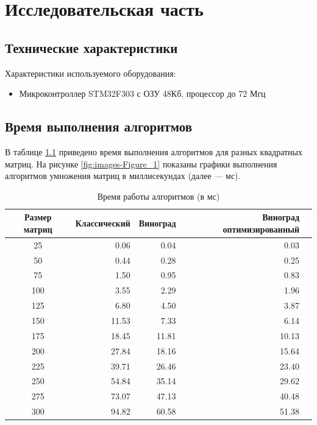 \chapter{Исследовательская часть}

\section{Технические характеристики}

Характеристики используемого оборудования:
\begin{itemize}
    \item Микроконтроллер STM32F303 с ОЗУ 48Кб, процессор  до 72 Мгц \cite{bib1}
\end{itemize}

\section{Время выполнения алгоритмов}

В таблице \ref{tbl:time_measurements} приведено время выполнения алгоритмов для разных
квадратных матриц. На рисунке \ref{fig:images-Figure_1} показаны графики
выполнения алгоритмов умножения матриц в миллисекундах (далее --- мс).

\begin{table}[h]
	\begin{center}
		\begin{threeparttable}
		\captionsetup{justification=raggedright,singlelinecheck=off}
		\caption{Время работы алгоритмов (в мс)}
		\label{tbl:time_measurements}
		\begin{tabular}{|c|r|r|r|r|}
			\hline
			Размер матриц &  Классический & Виноград & Виноград оптимизированный \\
			\hline
                        25 & 0.06 & 0.04 & 0.03 \\ \hline 
                        50 & 0.44 & 0.28 & 0.25 \\ \hline 
                        75 & 1.50 & 0.95 & 0.83 \\ \hline 
                        100 & 3.55 & 2.29 & 1.96 \\ \hline 
                        125 & 6.80 & 4.50 & 3.87 \\ \hline 
                        150 & 11.53 & 7.33 & 6.14 \\ \hline 
                        175 & 18.45 & 11.81 & 10.13 \\ \hline 
                        200 & 27.84 & 18.16 & 15.64 \\ \hline 
                        225 & 39.71 & 26.46 & 23.40 \\ \hline 
                        250 & 54.84 & 35.14 & 29.62 \\ \hline 
                        275 & 73.07 & 47.13 & 40.48 \\ \hline 
                        300 & 94.82 & 60.58 & 51.38 \\ \hline 
		\end{tabular}
		\end{threeparttable}
    \end{center}
\end{table}


